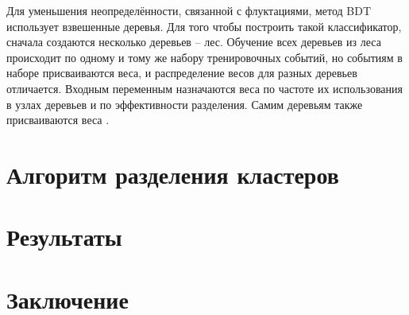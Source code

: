 \documentclass[14pt]{extarticle}
\begin{document}
Для уменьшения неопределённости, связанной с флуктациями, метод BDT использует взвешенные деревья. Для того чтобы построить такой классификатор, сначала создаются несколько деревьев -- лес. Обучение всех деревьев из леса происходит по одному и тому же набору тренировочных событий, но событиям в наборе присваиваются веса, и распределение весов для разных деревьев отличается. Входным переменным назначаются веса по частоте их использования в узлах деревьев и по эффективности разделения. Самим деревьям также присваиваются веса \cite{tmva4}.
\section{Алгоритм разделения кластеров}
\section{Результаты}
\section{Заключение}


\end{document}
